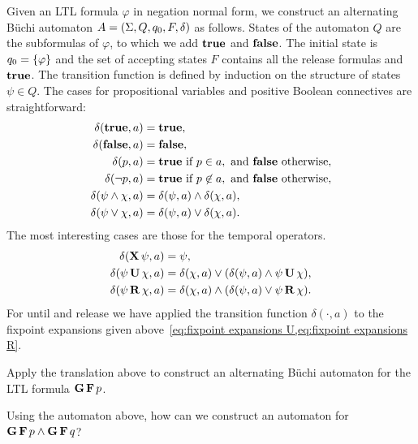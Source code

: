 Given an LTL formula $\varphi$ in negation normal form,
we construct an alternating Büchi automaton
$A = \left( \Sigma, Q, q_0, F, \delta \right)$ as follows.
%
States of the automaton $Q$ are the subformulas of $\varphi$,
to which we add $\mathbf{true}$ and $\mathbf{false}$.
%
The initial state is $q_0 = \left\{\varphi\right\}$
and the set of accepting states $F$ contains all the release formulas and $\mathbf{true}$.
%
The transition function is defined by induction
on the structure of states $\psi \in Q$.
%
The cases for propositional variables and positive Boolean connectives are straightforward:
%
\begin{align*}
	\delta(\mathbf{true}, a) &= \mathbf{true}, \\
	\delta(\mathbf{false}, a) &= \mathbf{false}, \\
	\delta(p, a) &= \mathbf{true} \text{ if } p \in a, \text{ and } \mathbf{false} \text{ otherwise}, \\
	\delta(\neg p, a) &= \mathbf{true} \text{ if } p \not\in a, \text{ and } \mathbf{false} \text{ otherwise}, \\
	\delta(\psi \wedge \chi, a) &= \delta(\psi, a) \wedge \delta(\chi, a), \\
	\delta(\psi \vee \chi, a) &= \delta(\psi, a) \vee \delta(\chi, a).
\end{align*}
%
The most interesting cases are those for the temporal operators.
%
\begin{align*}
	\delta(\mathbf X\, \psi, a)
		&= \psi, \\
	\delta(\psi \,\mathbf U\, \chi, a)
		&= \delta(\chi, a) \vee (\delta(\psi, a) \wedge \psi \,\mathbf U\, \chi), \\
	\delta(\psi \,\mathbf R\, \chi, a)
		&= \delta(\chi, a) \wedge (\delta(\psi, a) \vee \psi \,\mathbf R\, \chi).
\end{align*}
%
For until and release we have applied the transition function $\delta(\cdot, a)$
to the fixpoint expansions given above~\cref{eq:fixpoint expansions U,eq:fixpoint expansions R}.

\begin{exercise}
	Apply the translation above
	to construct an alternating Büchi automaton
	for the LTL formula $\mathbf G\, \mathbf F\, p$.
\end{exercise}

\begin{exercise}
	Using the automaton above, how can we construct an automaton for $\mathbf G\, \mathbf F\, p \wedge \mathbf G\, \mathbf F\, q$?
\end{exercise}


